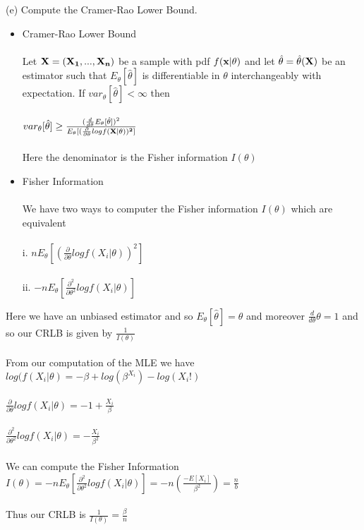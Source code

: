 \documentclass{article}
\begin{document}
(e) Compute the Cramer-Rao Lower Bound.
\begin{itemize}
    \item Cramer-Rao Lower Bound\\\\
    Let $\bf{X}=(X_1,...,X_n)$ be a sample with pdf $f(\bf{x}|\theta)$ and let $\hat{\theta}=\hat{\theta}(\bf{X})$ be an estimator such that $E_\theta[\hat{\theta}]$ is differentiable in $\theta$ interchangeably with expectation.  If $var_\theta[\hat{\theta}]<\infty$ then\\\\
    $var_\theta[\hat{\theta}]\geq\frac{(\frac{d}{d\theta}E_\theta[\hat{\theta}])^2}{E_\theta[(\frac{\partial}{\partial\theta}logf(\bf{X}|\theta))^2]}$\\\\
    Here the denominator is the Fisher information $I(\theta)$
    \item Fisher Information\\\\
    We have two ways to computer the Fisher information $I(\theta)$ which are equivalent\\\\
    i. $nE_\theta[(\frac{\partial}{\partial \theta}logf(X_i|\theta))^2]$\\\\
    ii. $-nE_\theta[\frac{\partial^2}{\partial \theta^2}logf(X_i|\theta)]$
\end{itemize}
Here we have an unbiased estimator and so $E_\theta[\hat{\theta}]=\theta$ and moreover $\frac{d}{d\theta}\theta=1$ and so our CRLB is given by $\frac{1}{I(\theta)}$\\\\
From our computation of the MLE we have\\ 
$log(f(X_i|\theta)=-\beta+log(\beta^{X_i})-log(X_i!)$\\\\
$\frac{\partial}{\partial \theta}logf(X_i|\theta)=-1+\frac{X_i}{\beta}$\\\\
$\frac{\partial^2}{\partial \theta^2}logf(X_i|\theta)=-\frac{X_i}{\beta^2}$\\\\
We can compute the Fisher Information\\
$I(\theta)=-nE_\theta[\frac{\partial^2}{\partial \theta^2}logf(X_i|\theta)]=-n(\frac{-E[X_i]}{\beta^2})=\frac{n}{b}$\\\\
Thus our CRLB is $\frac{1}{I(\theta)}=\frac{\beta}{n}$\\\\
\end{document}
